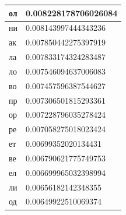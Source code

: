 \begin{table}[]
\begin{tabular}{ll}
\multicolumn{1}{|l|}{ол}          & \multicolumn{1}{l|}{0.008228178706026084}          \\ \hline
\multicolumn{1}{|l|}{ни}          & \multicolumn{1}{l|}{0.008143997444343236}          \\ \hline
\multicolumn{1}{|l|}{ак}          & \multicolumn{1}{l|}{0.007850442275397919}          \\ \hline
\multicolumn{1}{|l|}{ла}          & \multicolumn{1}{l|}{0.007833174324283487}          \\ \hline
\multicolumn{1}{|l|}{ло}          & \multicolumn{1}{l|}{0.007546094637006083}          \\ \hline
\multicolumn{1}{|l|}{во}          & \multicolumn{1}{l|}{0.007457596387544627}          \\ \hline
\multicolumn{1}{|l|}{пр}          & \multicolumn{1}{l|}{0.007306501815293361}          \\ \hline
\multicolumn{1}{|l|}{ор}          & \multicolumn{1}{l|}{0.007228796035278424}          \\ \hline
\multicolumn{1}{|l|}{ре}          & \multicolumn{1}{l|}{0.007058275018023424}          \\ \hline
\multicolumn{1}{|l|}{ет}          & \multicolumn{1}{l|}{0.00699352020134431}           \\ \hline
\multicolumn{1}{|l|}{ве}          & \multicolumn{1}{l|}{0.006790621775749753}          \\ \hline
\multicolumn{1}{|l|}{ел}          & \multicolumn{1}{l|}{0.006699965032398994}          \\ \hline
\multicolumn{1}{|l|}{ли}          & \multicolumn{1}{l|}{0.00656182142348355}           \\ \hline
\multicolumn{1}{|l|}{од}          & \multicolumn{1}{l|}{0.00649922510069374}           \\ \hline
\end{tabular}
\end{table}


